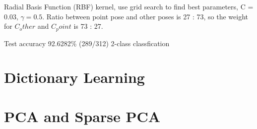 Radial Basis Function (RBF) kernel, use grid search to find best parameters, C =
0.03, $\gamma = 0.5$. Ratio between point pose and other poses is 27 : 73, so
the weight for $C_other$ and $C_point$ is 73 : 27. 

Test accuracy 92.6282\% (289/312) 2-class classfication


\section{Dictionary Learning}

\section{PCA and Sparse PCA}